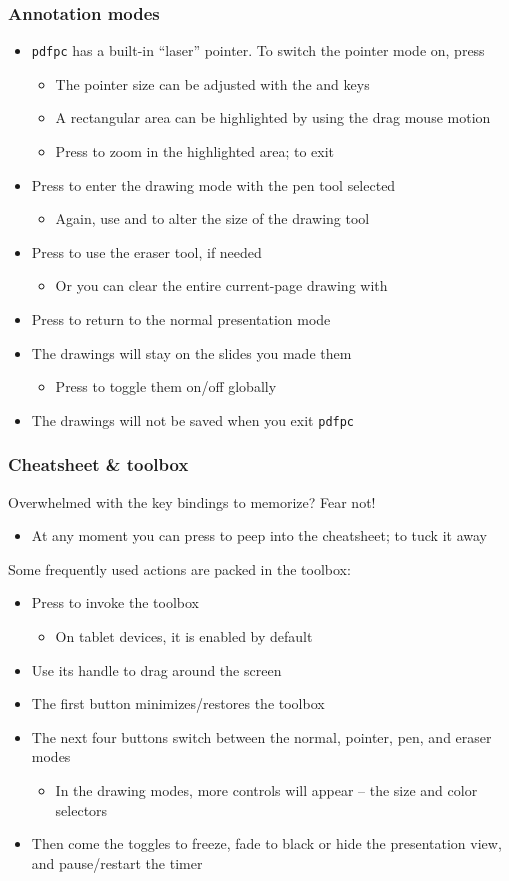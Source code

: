 \documentclass{beamer}
\newcommand{\singleitem}[1]{\begin{itemize}\item #1\end{itemize}}
\newcommand{\pdfpc}{\texttt{pdfpc}\xspace}
\begin{document}
\begin{frame}
  \frametitle{Annotation modes}
  \begin{itemize}
    \item \pdfpc has a built-in ``laser'' pointer. To switch the pointer
      mode on, press 
      \begin{itemize}
        \item The pointer size can be adjusted with the \keys{{+}} and \keys{-}
          keys
        \item A rectangular area can be highlighted by using the drag mouse
          motion
        \item Press  to zoom in the highlighted area;  to exit
      \end{itemize}
    \item Press  to enter the drawing mode with the pen tool selected
      \singleitem{Again, use \keys{{+}} and \keys{-} to alter the size of the
        drawing tool}
    \item Press  to use the eraser tool, if needed
      \singleitem{Or you can clear the entire current-page drawing with
        \keys{C}}
    \item Press  to return to the normal presentation mode
    \item The drawings will stay on the slides you made them
      \singleitem{Press  to toggle them on/off globally}
    \item The drawings will \alert{not} be saved when you exit \pdfpc
  \end{itemize}
\end{frame}

\begin{frame}
  \frametitle{Cheatsheet \& toolbox}
  Overwhelmed with the key bindings to memorize? Fear not!

  \singleitem{At any moment you can press  to peep into the cheatsheet;
    \keys{esc} to tuck it away}

  Some frequently used actions are packed in the toolbox:

  \begin{itemize}
    \item Press  to invoke the toolbox
      \singleitem{On tablet devices, it is enabled by default}
    \item Use its handle to drag around the screen
    \item The first button minimizes/restores the toolbox
    \item The next four buttons switch between the normal, pointer, pen, and
      eraser modes
      \singleitem{In the drawing modes, more controls will appear -- the size
        and color selectors}
    \item Then come the toggles to freeze, fade to black or hide the
      presentation view, and pause/restart the timer
  \end{itemize}
\end{frame}
\end{document}
